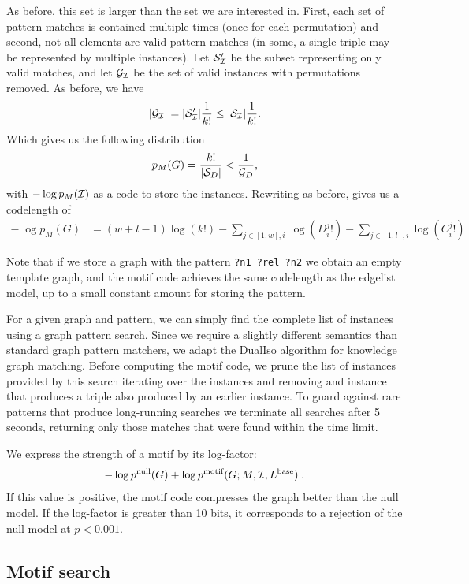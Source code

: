 \documentclass[runningheads]{style/llncs}
\newcommand{\G}{{\cal G}}
\newcommand{\cS}{{\cal S}}
\newcommand{\p}{\;\text{.}}
\newcommand{\I}{{\cal I}}
\begin{document}
As before, this set is larger than the set we are interested in. First, each set of pattern matches is contained multiple times (once for each permutation) and second, not all elements are valid pattern matches (in some, a single triple may be represented by multiple instances). Let $\cS_\I'$ be the subset representing only valid matches, and let $\G_\I$ be the set of valid instances with permutations removed. As before, we have
\[
|\G_\I| = |\cS'_\I| \frac{1}{k!} \leq  |\cS_\I| \frac{1}{k!} \text{.}
\]
Which gives us the following distribution
\[
p_M(G) =  \frac{k!}{|\cS_D|} < \frac{1}{\G_D} \text{,}
\]
 with $-\log p_M(\I)$ as a code to store the instances. Rewriting as before, gives us a codelength of 
 \begin{align*}
 - \log p_M(G) &= (w+l-1)\log(k!)
  -\sum_{j\in [1,w], i} \log(D^j_i!) -\sum_{j\in [1,l], i} \log(C^j_i!)
 \end{align*}
 
Note that if we store a graph with the pattern \texttt{?n1 ?rel ?n2} we obtain an empty template graph, and the motif code achieves the same codelength as the edgelist model, up to a small constant amount for storing the pattern.

For a given graph and pattern, we can simply find the complete list of instances using a graph pattern search. Since we require a slightly different semantics than standard graph pattern matchers, we adapt the DualIso algorithm \cite{saltz2014dualiso} for knowledge graph matching. Before computing the motif code, we prune the list of instances provided by this search iterating over the instances and removing and instance that produces a triple also produced by an earlier instance. To guard against rare patterns that produce long-running searches we terminate all searches after 5 seconds, returning  only those matches that were found within the time limit.

We express the strength of a motif by its log-factor: 
\[
-\log p^\text{null}(G) + \log p^\text{motif}(G; M, \I, L^\text{base})\p
\] 
If this value is positive, the motif code compresses the graph better than the null model. If the log-factor is greater than 10 bits, it corresponds to a rejection of the null model at $p < 0.001$.

\subsection{Motif search}
\end{document}
